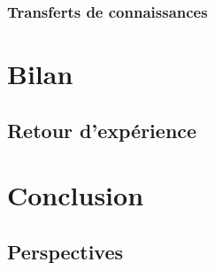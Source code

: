 \documentclass[french, a4paper]{beamer}
\begin{document}
\subsubsection{Transferts de connaissances}


\section{Bilan}
\subsection{Retour d'expérience}


\section{Conclusion}
\subsection{Perspectives}
\end{document}
